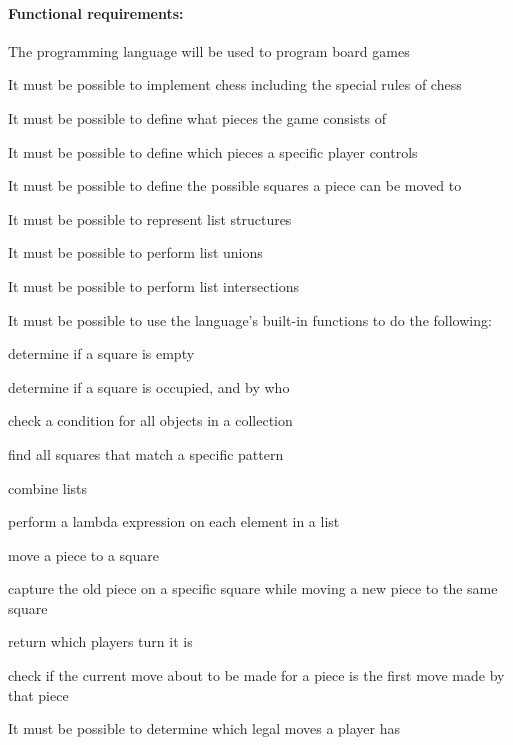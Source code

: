 \paragraph*{Functional requirements:}
\begin{nlist}
  \item The programming language will be used to program board games
  \begin{nlist}
    \item It must be possible to implement chess including the special rules of chess
  \end{nlist}
  \item It must be possible to define what pieces the game consists of
  \item It must be possible to define which pieces a specific player controls
  \item It must be possible to define the possible squares a piece can be moved to
  \item It must be possible to represent list structures
  \begin{nlist}
    \item It must be possible to perform list unions
    \item It must be possible to perform list intersections
  \end{nlist}
  \item It must be possible to use the language’s built-in functions to do the following:
  \begin{nlist}
    \item determine if a square is empty
    \item determine if a square is occupied, and by who
    \item check a condition for all objects in a collection
    \item find all squares that match a specific pattern
    \item combine lists
    \item perform a lambda expression on each element in a list
    \item move a piece to a square
    \item capture the old piece on a specific square while moving a new piece to the same square
    \item return which players turn it is
    \item check if the current move about to be made for a piece is the first move made by that piece
  \end{nlist}
  \item It must be possible to determine which legal moves a player has

\end{nlist}
